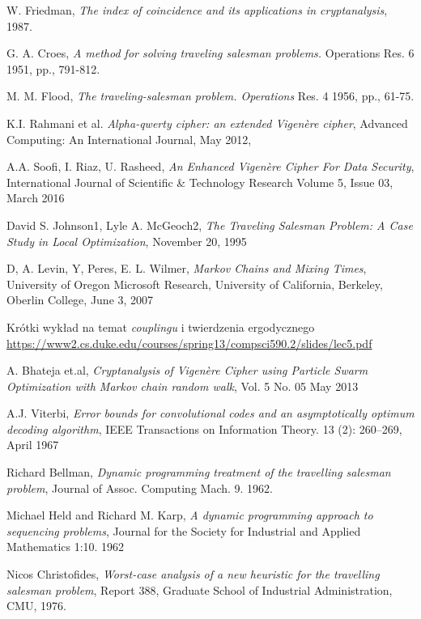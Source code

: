 \documentclass[a4paper]{article}
\theoremstyle{defn}
\theoremstyle{theorem}
\theoremstyle{lemma}
\theoremstyle{cor}
\theoremstyle{fact}
\begin{document}
\begin{thebibliography}{9}
W. Friedman, \emph{The index of coincidence and its applications in cryptanalysis}, 1987.

 G. A. Croes, \emph{A method for solving traveling salesman problems.} Operations Res. 6 1951, pp., 791-812.

 M. M. Flood, \emph{The traveling-salesman problem. Operations} Res. 4 1956, pp., 61-75.

K.I. Rahmani et al. \emph{Alpha-qwerty cipher: an extended Vigenère cipher},
Advanced Computing: An International Journal,  May 2012,

A.A. Soofi, I. Riaz, U. Rasheed,
\emph{An Enhanced Vigenère Cipher For Data Security},
International Journal of Scientific \& Technology Research Volume 5, Issue 03, March 2016

David S. Johnson1, Lyle A. McGeoch2,
\emph{The Traveling Salesman Problem:
A Case Study in Local Optimization},
November 20, 1995

D, A. Levin, Y, Peres, E. L. Wilmer,
\emph{Markov Chains and Mixing Times},
University of Oregon Microsoft Research,
University of California, Berkeley,
Oberlin College,
June 3, 2007

Krótki wykład na temat \textit{couplingu} i twierdzenia ergodycznego \href{https://www2.cs.duke.edu/courses/spring13/compsci590.2/slides/lec5.pdf}{https://www2.cs.duke.edu/courses/spring13/compsci590.2/slides/lec5.pdf}

A. Bhateja et.al, \emph{Cryptanalysis of Vigenère Cipher using Particle
Swarm Optimization with Markov chain random walk}, Vol. 5 No. 05 May 2013

A.J. Viterbi,  \emph{Error bounds for convolutional codes and an asymptotically optimum decoding algorithm}, IEEE Transactions on Information Theory. 13 (2): 260–269, April 1967

 Richard Bellman, \emph{Dynamic programming treatment of the travelling salesman problem}, Journal of Assoc. Computing Mach. 9. 1962.

 Michael Held and Richard M. Karp, \emph{A dynamic programming approach to sequencing problems},  Journal for the Society for Industrial and Applied Mathematics 1:10. 1962

  Nicos Christofides, \emph{Worst-case analysis of a new heuristic for the travelling salesman problem}, Report 388, Graduate School of Industrial Administration, CMU, 1976.


\end{thebibliography}
\end{document}
